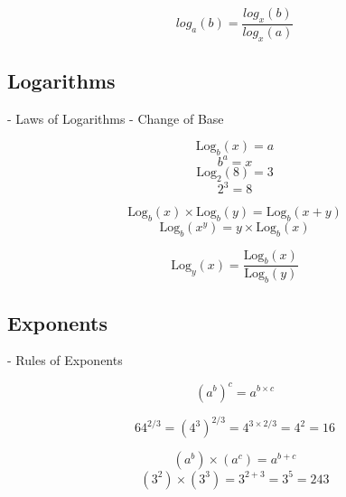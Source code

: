 \documentclass[12pt]{article}
\begin{document}
\[ log_a(b) = \frac{log_x(b)}{log_x(a)} \]

\subsection{Logarithms} 
 - Laws of Logarithms
 - Change of Base
  
 \[ \mbox{Log}_b(x) = a \] \[b^a = x \]
 \[ \mbox{Log}_2(8) = 3 \] \[2^3 = 8 \]

 \[ \mbox{Log}_b(x) \times \mbox{Log}_b(y) =  \mbox{Log}_b(x+y) \]
 \[ \mbox{Log}_b(x^y) =  y \times \mbox{Log}_b(x) \]

 \[ \mbox{Log}_y(x)  =  \frac{ \mbox{Log}_b(x) }{ \mbox{Log}_b(y) } \]
\subsection{Exponents}
 - Rules of Exponents

\[ (a^b)^c = a^{b \times c}\]

\[ 64^{2/3} =  (4^3)^{2/3} = 4^{3\times2/3} = 4^2 = 16 \]


\[ (a^b) \times (a^c) = a^{b+c}\]
\[ (3^2) \times (3^3) = 3^{2+3} = 3^5  =243 \]
\end{document}
